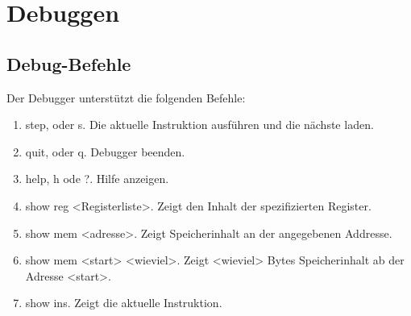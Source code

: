 \section{Debuggen}

\subsection{Debug-Befehle}

Der Debugger unterstützt die folgenden Befehle:

\begin{enumerate}
 \item step, oder s. Die aktuelle Instruktion ausführen und die nächste laden.
 \item quit, oder q. Debugger beenden.
 \item help, h ode ?. Hilfe anzeigen.
 \item show reg <Registerliste>. Zeigt den Inhalt der spezifizierten Register.
 \item show mem <adresse>. Zeigt Speicherinhalt an der angegebenen Addresse.
 \item show mem <start> <wieviel>. Zeigt <wieviel> Bytes Speicherinhalt ab
       der Adresse <start>.
 \item show ins. Zeigt die aktuelle Instruktion.
\end{enumerate}

